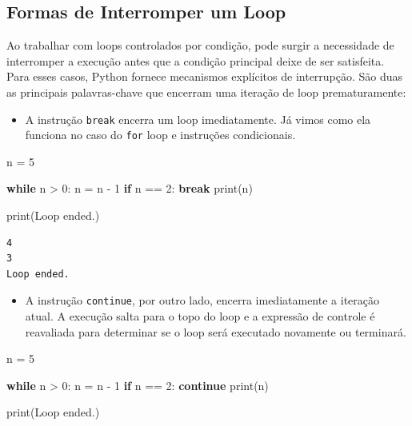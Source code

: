 \documentclass[
  brazilian,
  letterpaper,
  DIV=11,
  numbers=noendperiod]{scrreprt}
\newenvironment{Shaded}{\begin{snugshade}}{\end{snugshade}}
\newcommand{\BuiltInTok}[1]{\textcolor[rgb]{0.00,0.23,0.31}{#1}}
\newcommand{\ControlFlowTok}[1]{\textcolor[rgb]{0.00,0.23,0.31}{\textbf{#1}}}
\newcommand{\DecValTok}[1]{\textcolor[rgb]{0.68,0.00,0.00}{#1}}
\newcommand{\NormalTok}[1]{\textcolor[rgb]{0.00,0.23,0.31}{#1}}
\newcommand{\OperatorTok}[1]{\textcolor[rgb]{0.37,0.37,0.37}{#1}}
\newcommand{\StringTok}[1]{\textcolor[rgb]{0.13,0.47,0.30}{#1}}
\providecommand{\tightlist}{%
  \setlength{\itemsep}{0pt}\setlength{\parskip}{0pt}}
\begin{document}
\subsection{Formas de Interromper um
Loop}\label{formas-de-interromper-um-loop}

Ao trabalhar com loops controlados por condição, pode surgir a
necessidade de interromper a execução antes que a condição principal
deixe de ser satisfeita. Para esses casos, Python fornece mecanismos
explícitos de interrupção. São duas as principais palavras-chave que
encerram uma iteração de loop prematuramente:

\begin{itemize}
\tightlist
\item
  A instrução \texttt{break} encerra um loop imediatamente. Já vimos
  como ela funciona no caso do \texttt{for} loop e instruções
  condicionais.
\end{itemize}

\begin{Shaded}
\begin{Highlighting}[]
\NormalTok{n }\OperatorTok{=} \DecValTok{5}

\ControlFlowTok{while}\NormalTok{ n }\OperatorTok{\textgreater{}} \DecValTok{0}\NormalTok{:}
\NormalTok{    n }\OperatorTok{=}\NormalTok{ n }\OperatorTok{{-}} \DecValTok{1}
    \ControlFlowTok{if}\NormalTok{ n }\OperatorTok{==} \DecValTok{2}\NormalTok{:}
        \ControlFlowTok{break}
    \BuiltInTok{print}\NormalTok{(n)}
    
\BuiltInTok{print}\NormalTok{(}\StringTok{\textquotesingle{}Loop ended.\textquotesingle{}}\NormalTok{)}
\end{Highlighting}
\end{Shaded}

\begin{verbatim}
4
3
Loop ended.
\end{verbatim}

\begin{itemize}
\tightlist
\item
  A instrução \texttt{continue}, por outro lado, encerra imediatamente a
  iteração atual. A execução salta para o topo do loop e a expressão de
  controle é reavaliada para determinar se o loop será executado
  novamente ou terminará.
\end{itemize}

\begin{Shaded}
\begin{Highlighting}[]
\NormalTok{n }\OperatorTok{=} \DecValTok{5}

\ControlFlowTok{while}\NormalTok{ n }\OperatorTok{\textgreater{}} \DecValTok{0}\NormalTok{:}
\NormalTok{    n }\OperatorTok{=}\NormalTok{ n }\OperatorTok{{-}} \DecValTok{1}
    \ControlFlowTok{if}\NormalTok{ n }\OperatorTok{==} \DecValTok{2}\NormalTok{:}
        \ControlFlowTok{continue}
    \BuiltInTok{print}\NormalTok{(n)}

\BuiltInTok{print}\NormalTok{(}\StringTok{\textquotesingle{}Loop ended.\textquotesingle{}}\NormalTok{)}
\end{Highlighting}
\end{Shaded}
\end{document}
